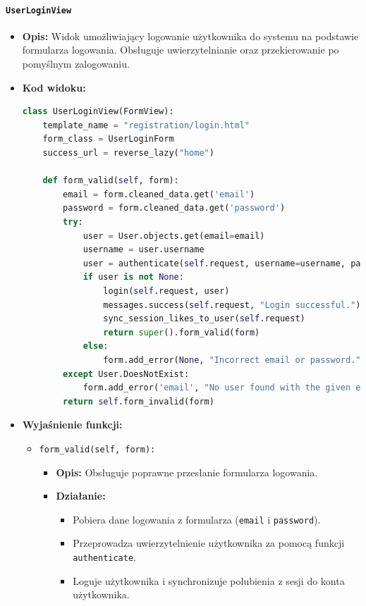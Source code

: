 \documentclass[12pt,a4paper,oneside]{article}
\theoremstyle{definition}
\numberwithin{equation}{section}
\begin{document}
\paragraph{\texttt{UserLoginView}}
\begin{itemize}
    \item \textbf{Opis:} Widok umożliwiający logowanie użytkownika do systemu na podstawie formularza logowania. Obsługuje uwierzytelnianie oraz przekierowanie po pomyślnym zalogowaniu.
    \item \textbf{Kod widoku:}
    \begin{lstlisting}[language=Python, caption=UserLoginView]
class UserLoginView(FormView):
    template_name = "registration/login.html"
    form_class = UserLoginForm
    success_url = reverse_lazy("home")

    def form_valid(self, form):
        email = form.cleaned_data.get('email')
        password = form.cleaned_data.get('password')
        try:
            user = User.objects.get(email=email)
            username = user.username
            user = authenticate(self.request, username=username, password=password)
            if user is not None:
                login(self.request, user)
                messages.success(self.request, "Login successful.")
                sync_session_likes_to_user(self.request)
                return super().form_valid(form)
            else:
                form.add_error(None, "Incorrect email or password.")
        except User.DoesNotExist:
            form.add_error('email', "No user found with the given email address.")
        return self.form_invalid(form)
    \end{lstlisting}

    \item \textbf{Wyjaśnienie funkcji:}
    \begin{itemize}
        \item \texttt{form\_valid(self, form):}
        \begin{itemize}
            \item \textbf{Opis:} Obsługuje poprawne przesłanie formularza logowania.
            \item \textbf{Działanie:}
            \begin{itemize}
                \item Pobiera dane logowania z formularza (\texttt{email} i \texttt{password}).
                \item Przeprowadza uwierzytelnienie użytkownika za pomocą funkcji \texttt{authenticate}.
                \item Loguje użytkownika i synchronizuje polubienia z sesji do konta użytkownika.
            \end{itemize}
        \end{itemize}


\end{itemize}
\end{itemize}
\end{document}
